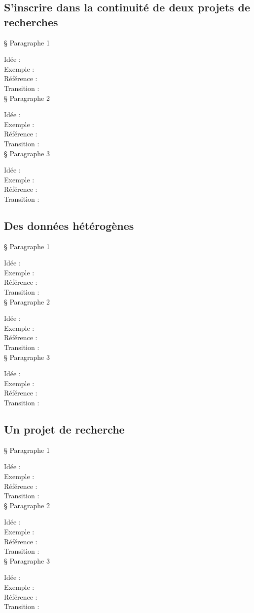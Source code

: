     \subsection{S’inscrire dans la continuité de deux projets de recherches}

§ Paragraphe 1

Idée :\\
Exemple :\\
Référence :\\
Transition :\\

§ Paragraphe 2

Idée :\\
Exemple :\\
Référence :\\
Transition :\\

§ Paragraphe 3

Idée :\\
Exemple :\\
Référence :\\
Transition :\\

\subsection{Des données hétérogènes}

§ Paragraphe 1

Idée :\\
Exemple :\\
Référence :\\
Transition :\\

§ Paragraphe 2

Idée :\\
Exemple :\\
Référence :\\
Transition :\\

§ Paragraphe 3

Idée :\\
Exemple :\\
Référence :\\
Transition :\\

\subsection{Un projet de recherche}

§ Paragraphe 1

Idée :\\
Exemple :\\
Référence :\\
Transition :\\

§ Paragraphe 2

Idée :\\
Exemple :\\
Référence :\\
Transition :\\

§ Paragraphe 3

Idée :\\
Exemple :\\
Référence :\\
Transition :\\